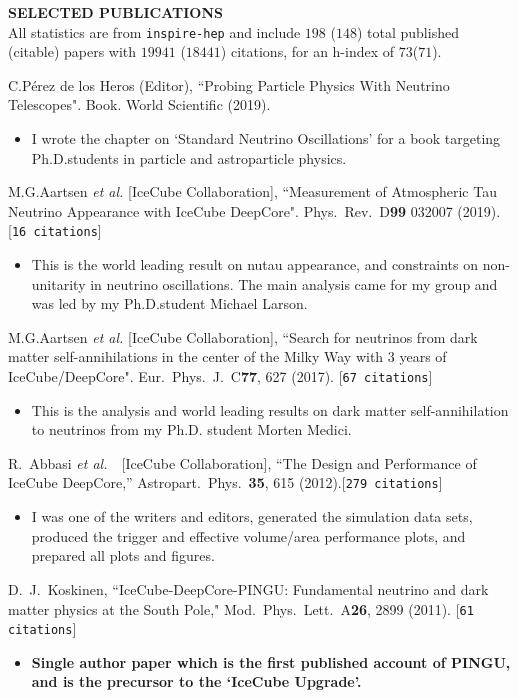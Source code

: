 \documentclass[a4paper,11pt]{article}
\renewcommand{\smallskip} {\vspace{0.1in}}
\begin{document}
\noindent
\textbf{SELECTED PUBLICATIONS ~~\hrulefill}\\ 
All statistics are from \texttt{inspire-hep} and include $198$ ($148$) total published (citable) papers with $19941$ ($18441$) citations, for an h-index of $73$($71$).
%
\noindent
\begin{etaremune}[topsep=0pt,itemsep=1.0pt,partopsep=0pt,parsep=0pt]
\itemsep 1pt
%
\item{C.\@ Pérez de los Heros (Editor), ``Probing Particle Physics With Neutrino Telescopes". Book. World Scientific (2019).}
\begin{itemize}
\item{I wrote the chapter on `Standard Neutrino Oscillations' for a book targeting Ph.D.\@ students in particle and astroparticle physics.\smallskip}
\end{itemize}
%
\item{M.\@ G.\@ Aartsen {\it et al.\@} [IceCube Collaboration], ``Measurement of Atmospheric Tau Neutrino Appearance with IceCube DeepCore". Phys.\ Rev.\ D{\bf99} 032007 (2019). \hfill [{\tt 16~citations}]}
\begin{itemize}
\item{This is the world leading result on nutau appearance, and constraints on non-unitarity in neutrino oscillations. The main analysis came for my group and was led by my Ph.D.\@ student Michael Larson.\smallskip}
\end{itemize}
%
\item{M.\@ G.\@ Aartsen {\it et al.\@} [IceCube Collaboration], ``Search for neutrinos from dark matter self-annihilations in the  center of the Milky Way with 3 years of IceCube/DeepCore". Eur.\ Phys.\ J.\ C{\bf77}, 627 (2017). \hfill [{\tt 67~citations}]}
\begin{itemize}
\item{This is the analysis and world leading results on dark matter self-annihilation to neutrinos from my Ph.D. student Morten Medici.\smallskip}
\end{itemize}
%
\item{R.~Abbasi {\it et al.}~~[IceCube Collaboration], ``The Design and Performance of IceCube DeepCore,''  Astropart.\ Phys.\  {\bf 35}, 615 (2012).\hfill[{\tt 279~citations}]}
\begin{itemize}
\item{I was one of the writers and editors, generated the simulation data sets, produced the trigger and effective volume/area performance plots, and prepared all plots and figures.\smallskip}
\end{itemize}
%
\item{ D.~J.~Koskinen, ``IceCube-DeepCore-PINGU: Fundamental neutrino and dark matter physics at the South Pole," Mod.\ Phys.\ Lett.\ A{\bf 26}, 2899 (2011). \hfill[{\tt 61 citations}]}
\begin{itemize}
\item{\textbf{Single author paper which is the first published account of PINGU, and is the precursor to the `IceCube Upgrade'.}\smallskip}
\end{itemize}


\end{etaremune}
\end{document}

